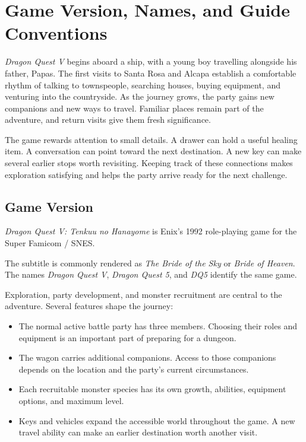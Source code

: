 \chapter{Game Version, Names, and Guide Conventions}
\label{written-conventions}

\emph{Dragon Quest V} begins aboard a ship, with a young boy travelling
alongside his father, Papas. The first visits to Santa Rosa and Alcapa
establish a comfortable rhythm of talking to townspeople, searching houses,
buying equipment, and venturing into the countryside. As the journey grows,
the party gains new companions and new ways to travel. Familiar places
remain part of the adventure, and return visits give them fresh significance.

The game rewards attention to small details. A drawer can hold a useful
healing item. A conversation can point toward the next destination. A new
key can make several earlier stops worth revisiting. Keeping track of these
connections makes exploration satisfying and helps the party arrive ready
for the next challenge.

\section{Game Version}

\emph{Dragon Quest V: Tenkuu no Hanayome} is Enix's 1992 role-playing game
for the Super Famicom / SNES.

The subtitle is commonly rendered as \emph{The Bride of the Sky} or
\emph{Bride of Heaven}. The names \emph{Dragon Quest V}, \emph{Dragon
Quest 5}, and \emph{DQ5} identify the same game.

Exploration, party development, and monster recruitment are central to the
adventure. Several features shape the journey:
\begin{itemize}
  \item The normal active battle party has three members. Choosing their
    roles and equipment is an important part of preparing for a dungeon.
  \item The wagon carries additional companions. Access to those companions
    depends on the location and the party's current circumstances.
  \item Each recruitable monster species has its own growth, abilities,
    equipment options, and maximum level.
  \item Keys and vehicles expand the accessible world throughout the game.
    A new travel ability can make an earlier destination worth another visit.
\end{itemize}

